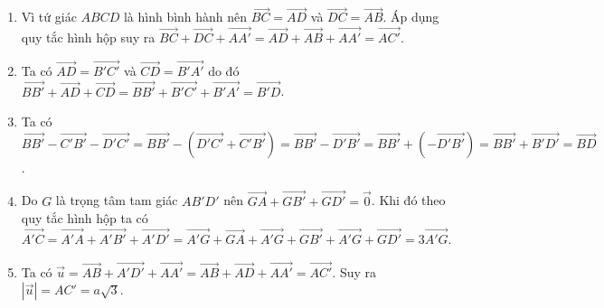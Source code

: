 \begin{bt}
{\begin{enumerate}
			\item Vì tứ  giác $ABCD$ là hình bình hành nên $\overrightarrow{BC}=\overrightarrow{AD}$ và $\overrightarrow{DC}=\overrightarrow{AB}$.
			 Áp dụng quy tắc hình hộp suy ra $\overrightarrow{BC}+\overrightarrow{DC}+\overrightarrow{AA'}=\overrightarrow{AD}+\overrightarrow{AB}+\overrightarrow{AA'}=\overrightarrow{AC'}$.
			\item Ta có  $\overrightarrow{AD}=\overrightarrow{B'C'}$ và $\overrightarrow{CD}=\overrightarrow{B'A'}$ do đó $\overrightarrow{BB'}+\overrightarrow{AD}+\overrightarrow{CD}=\overrightarrow{BB'}+\overrightarrow{B'C'}+\overrightarrow{B'A'}=\overrightarrow{B'D}$.
			\item Ta  có\\ $\overrightarrow{BB'}-\overrightarrow{C'B'}-\overrightarrow{D'C'}=\overrightarrow{BB'}-\left(\overrightarrow{D'C'}+\overrightarrow{C'B'}\right)=\overrightarrow{BB'}-\overrightarrow{D'B'}=\overrightarrow{BB'}+\left(-\overrightarrow{D'B'}\right)=\overrightarrow{BB'}+\overrightarrow{B'D'}=\overrightarrow{BD}$.
			\item  Do $G$ là trọng tâm tam giác $AB'D'$ nên $\overrightarrow{GA}+\overrightarrow{GB'}+\overrightarrow{GD'}=\overrightarrow{0}$. Khi đó theo quy tắc hình hộp ta có
			 $\overrightarrow{A'C}=\overrightarrow{A'A}+\overrightarrow{A'B'}+\overrightarrow{A'D'}=\overrightarrow{A'G}+\overrightarrow{GA}+\overrightarrow{A'G}+\overrightarrow{GB'}+\overrightarrow{A'G}+\overrightarrow{GD'}=3\overrightarrow{A'G}$.
			\item Ta có $\overrightarrow{u}=\overrightarrow{AB}+\overrightarrow{A'D'}+\overrightarrow{AA'}=\overrightarrow{AB}+\overrightarrow{AD}+\overrightarrow{AA'}=\overrightarrow{AC'}$. Suy ra  $\left|\overrightarrow{u}\right|=AC'=a\sqrt{3}$.
		\end{enumerate}
	} 
\end{bt}

